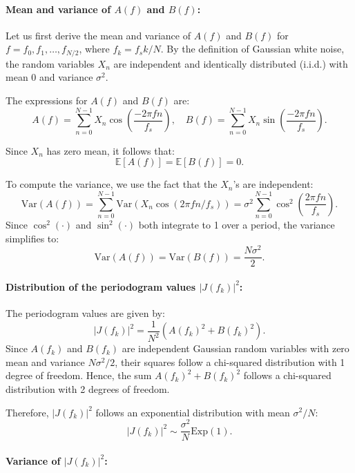 \documentclass[11pt]{article}
\begin{document}
\begin{solution}

    \paragraph{Mean and variance of \(A(f)\) and \(B(f)\):}
    
    Let us first derive the mean and variance of \(A(f)\) and \(B(f)\) for \(f = f_0, f_1, \dots, f_{N/2}\), where \(f_k = f_s k / N\). By the definition of Gaussian white noise, the random variables \(X_n\) are independent and identically distributed (i.i.d.) with mean 0 and variance \(\sigma^2\).
    
    The expressions for \(A(f)\) and \(B(f)\) are:
    \[
    A(f) = \sum_{n=0}^{N-1} X_n \cos\left( \frac{-2\pi f n}{f_s} \right), \quad B(f) = \sum_{n=0}^{N-1} X_n \sin\left( \frac{-2\pi f n}{f_s} \right).
    \]
    
    Since \(X_n\) has zero mean, it follows that:
    \[
    \mathbb{E}[A(f)] = \mathbb{E}[B(f)] = 0.
    \]
    
    To compute the variance, we use the fact that the \(X_n\)'s are independent:
    \[
    \text{Var}(A(f)) = \sum_{n=0}^{N-1} \text{Var}(X_n \cos(2\pi f n / f_s)) = \sigma^2 \sum_{n=0}^{N-1} \cos^2\left( \frac{2\pi f n}{f_s} \right).
    \]
    Since \(\cos^2(\cdot)\) and \(\sin^2(\cdot)\) both integrate to 1 over a period, the variance simplifies to:
    \[
    \text{Var}(A(f)) = \text{Var}(B(f)) = \frac{N \sigma^2}{2}.
    \]
    
    \paragraph{Distribution of the periodogram values \( |J(f_k)|^2 \):}
    
    The periodogram values are given by:
    \[
    |J(f_k)|^2 = \frac{1}{N^2} \left( A(f_k)^2 + B(f_k)^2 \right).
    \]
    Since \(A(f_k)\) and \(B(f_k)\) are independent Gaussian random variables with zero mean and variance \(N \sigma^2 / 2\), their squares follow a chi-squared distribution with 1 degree of freedom. Hence, the sum \(A(f_k)^2 + B(f_k)^2\) follows a chi-squared distribution with 2 degrees of freedom.
    
    Therefore, \( |J(f_k)|^2 \) follows an exponential distribution with mean \( \sigma^2 / N \):
    \[
    |J(f_k)|^2 \sim \frac{\sigma^2}{N} \text{Exp}(1).
    \]
    
    \paragraph{Variance of \( |J(f_k)|^2 \):}
    

\end{solution}
\end{document}
